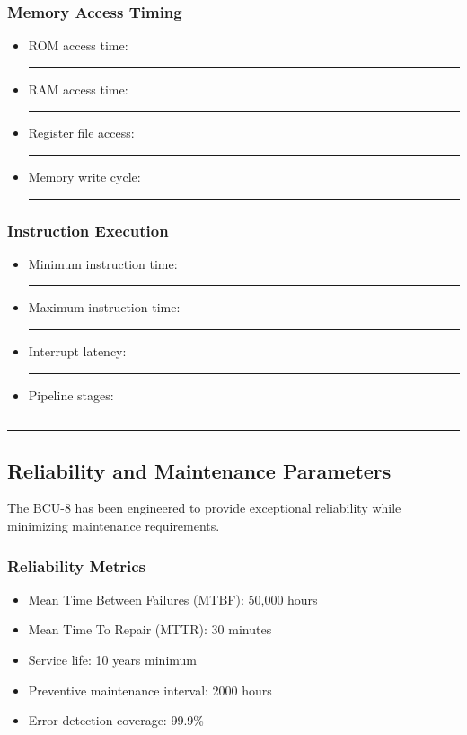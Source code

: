 \documentclass[12pt]{article}
\begin{document}
\subsubsection{Memory Access Timing}
\begin{itemize}
    \item ROM access time: \rule{45mm}{3.5mm}
    \item RAM access time: \rule{45mm}{3.5mm}
    \item Register file access: \rule{45mm}{3.5mm}
    \item Memory write cycle: \rule{45mm}{3.5mm}
\end{itemize}

\subsubsection{Instruction Execution}
\begin{itemize}
    \item Minimum instruction time: \rule{45mm}{3.5mm}
    \item Maximum instruction time: \rule{45mm}{3.5mm}
    \item Interrupt latency: \rule{45mm}{3.5mm}
    \item Pipeline stages: \rule{35mm}{3.5mm}
\end{itemize}

\begin{center}
\textcolor{sovietred}{\rule{0.8\textwidth}{0.4pt}}
\end{center}

\subsection{Reliability and Maintenance Parameters}
The BCU-8 has been engineered to provide exceptional reliability while minimizing maintenance requirements.

\subsubsection{Reliability Metrics}
\begin{itemize}
    \item Mean Time Between Failures (MTBF): 50,000 hours
    \item Mean Time To Repair (MTTR): 30 minutes
    \item Service life: 10 years minimum
    \item Preventive maintenance interval: 2000 hours
    \item Error detection coverage: 99.9\%
\end{itemize}
\end{document}
